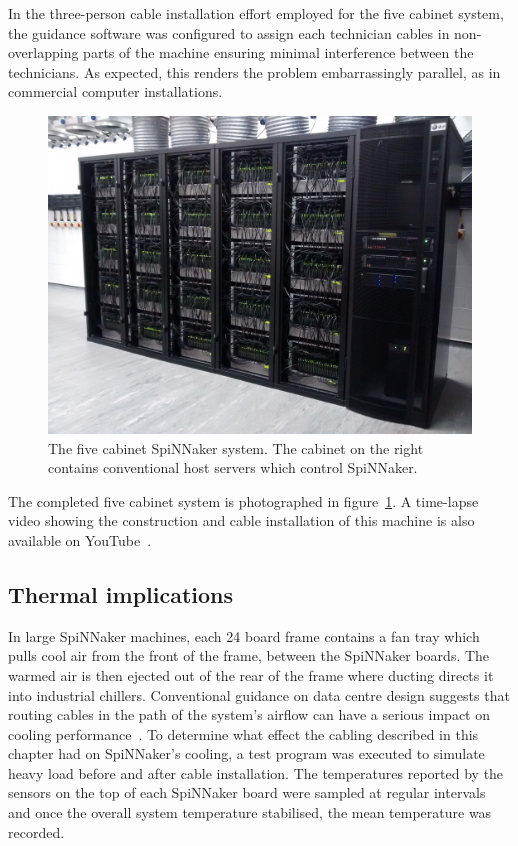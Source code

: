 			In the three-person cable installation effort employed for the five
			cabinet system, the guidance software was configured to assign each
			technician cables in non-overlapping parts of the machine ensuring
			minimal interference between the technicians. As expected, this renders
			the problem embarrassingly parallel, as in commercial computer
			installations.
			
			\begin{figure}
				\center
				\includegraphics[width=0.8\linewidth]{figures/halfMillionCoreComplete.jpg}
				
				\caption[The five cabinet SpiNNaker system.]%
				{The five cabinet SpiNNaker system. The cabinet on the right contains
				conventional host servers which control SpiNNaker.}
				\label{fig:halfMillionCoreComplete}
			\end{figure}
			
			The completed five cabinet system is photographed in
			figure~\ref{fig:halfMillionCoreComplete}. A time-lapse video showing the
			construction and cable installation of this machine is also available on
			YouTube~\cite{heathcote16}.
			
		\subsection{Thermal implications}
			
			In large SpiNNaker machines, each 24 board frame contains a fan tray
			which pulls cool air from the front of the frame, between the SpiNNaker
			boards. The warmed air is then ejected out of the rear of the frame where
			ducting directs it into industrial chillers. Conventional guidance on
			data centre design suggests that routing cables in the path of the
			system's airflow can have a serious impact on cooling
			performance~\cite{cisco07}.  To determine what effect the cabling
			described in this chapter had on SpiNNaker's cooling, a test program was
			executed to simulate heavy load before and after cable installation. The
			temperatures reported by the sensors on the top of each SpiNNaker board
			were sampled at regular intervals and once the overall system temperature
			stabilised, the mean temperature was recorded.
			
